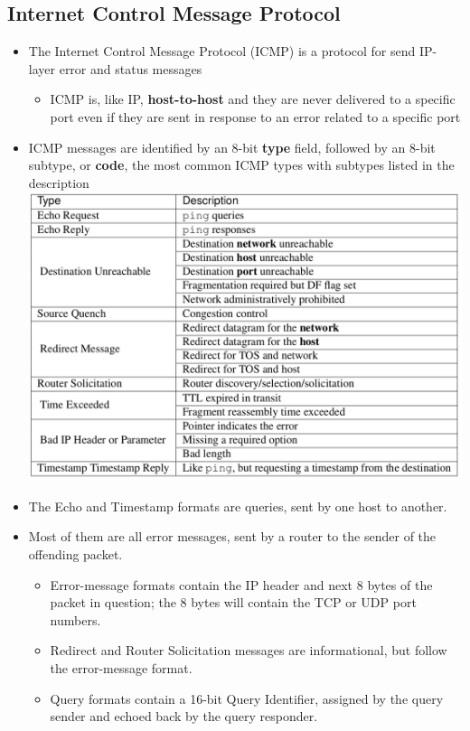 \documentclass[11pt]{article}
\makeatletter
\def\maxwidth{\ifdim\Gin@nat@width>\linewidth\linewidth
    \else\Gin@nat@width\fi}
\let\Oldincludegraphics\includegraphics
\renewcommand{\includegraphics}[1]{\Oldincludegraphics[width=.8\maxwidth]{#1}}
\providecommand{\tightlist}{%
      \setlength{\itemsep}{0pt}\setlength{\parskip}{0pt}}
\makeatother
\begin{document}
    \subsection{Internet Control Message
Protocol}\label{internet-control-message-protocol}

\begin{itemize}
\item
  The Internet Control Message Protocol (ICMP) is a protocol for send
  IP-layer error and status messages

  \begin{itemize}
  \tightlist
  \item
    ICMP is, like IP, \textbf{host-to-host} and they are never delivered
    to a specific port even if they are sent in response to an error
    related to a specific port
  \end{itemize}
\item
  ICMP messages are identified by an 8-bit \textbf{type} field, followed
  by an 8-bit subtype, or \textbf{code}, the most common ICMP types with
  subtypes listed in the description
  \includegraphics{img/ICMP_types.png}
\item
  The Echo and Timestamp formats are queries, sent by one host to
  another.
\item
  Most of them are all error messages, sent by a router to the sender of
  the offending packet.

  \begin{itemize}
  \tightlist
  \item
    Error-message formats contain the IP header and next 8 bytes of the
    packet in question; the 8 bytes will contain the TCP or UDP port
    numbers.
  \item
    Redirect and Router Solicitation messages are informational, but
    follow the error-message format.
  \item
    Query formats contain a 16-bit Query Identifier, assigned by the
    query sender and echoed back by the query responder.
  \end{itemize}
\end{itemize}
\end{document}
